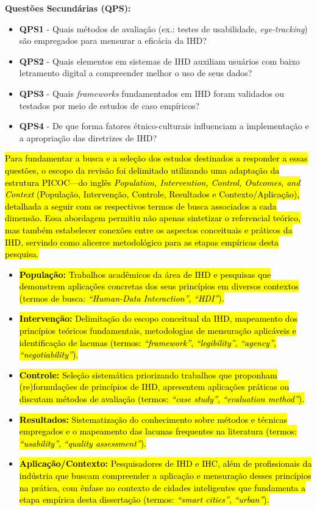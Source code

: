 \documentclass[
	12pt,				%
	oneside,			%
	a4paper,			%
	english,			%
	brazil				%
	]{abntex2ppgsi}
\begin{document}
\textbf{Questões Secundárias (QPS):}
\begin{itemize}
    \item[] \textbf{QPS1} - Quais métodos de avaliação (ex.: testes de usabilidade, \textit{eye-tracking}) são empregados para mensurar a eficácia da IHD?
    \item[] \textbf{QPS2} - Quais elementos em sistemas de IHD auxiliam usuários com baixo letramento digital a compreender melhor o uso de seus dados?
    \item[] \textbf{QPS3} - Quais \textit{frameworks} fundamentados em IHD foram validados ou testados por meio de estudos de caso empíricos?
    \item[] \textbf{QPS4} - De que forma fatores étnico-culturais influenciam a implementação e a apropriação das diretrizes de IHD?
\end{itemize}

    \hl{Para fundamentar a busca e a seleção dos estudos destinados a responder a essas questões, o escopo da revisão foi delimitado utilizando uma adaptação da estrutura PICOC---do inglês \textit{Population, Intervention, Control, Outcomes, and Context} (População, Intervenção, Controle, Resultados e Contexto/Aplicação), detalhada a seguir com os respectivos termos de busca associados a cada dimensão. Essa abordagem permitiu não apenas sintetizar o referencial teórico, mas também estabelecer conexões entre os aspectos conceituais e práticos da IHD, servindo como alicerce metodológico para as etapas empíricas desta pesquisa.}

\begin{itemize}
    \item[] \hl{\textbf{População:} Trabalhos acadêmicos da área de IHD e pesquisas que demonstrem aplicações concretas dos seus princípios em diversos contextos (termos de busca: \textit{``Human-Data Interaction''}, \textit{``HDI''}).}
    \item[] \hl{\textbf{Intervenção:} Delimitação do escopo conceitual da IHD, mapeamento dos princípios teóricos fundamentais, metodologias de mensuração aplicáveis e identificação de lacunas (termos: \textit{``framework''}, \textit{``legibility''}, \textit{``agency''}, \textit{``negotiability''}).}
    \item[] \hl{\textbf{Controle:} Seleção sistemática priorizando trabalhos que proponham (re)formulações de princípios de IHD, apresentem aplicações práticas ou discutam métodos de avaliação (termos: \textit{``case study''}, \textit{``evaluation method''}).}
    \item[] \hl{\textbf{Resultados:} Sistematização do conhecimento sobre métodos e técnicas empregados e o mapeamento das lacunas frequentes na literatura (termos: \textit{``usability''}, \textit{``quality assessment''}).}
    \item[] \hl{\textbf{Aplicação/Contexto:} Pesquisadores de IHD e IHC, além de profissionais da indústria que buscam compreender a aplicação e mensuração desses princípios na prática, com ênfase no contexto de cidades inteligentes que fundamenta a etapa empírica desta dissertação (termos: \textit{``smart cities''}, \textit{``urban''}).}
\end{itemize}
\end{document}
